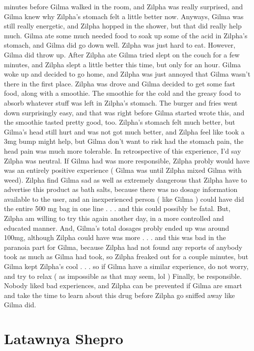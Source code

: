 \documentclass[12pt]{book}
\begin{document}
minutes before Gilma walked in the room, and Zilpha was really surprised, and Gilma knew why Zilpha's stomach felt a little better now. Anyways, Gilma was still really energetic, and Zilpha hopped in the shower, but that did really help much. Gilma ate some much needed food to soak up some of the acid in Zilpha's stomach, and Gilma did go down well. Zilpha was just hard to eat. However, Gilma did throw up. After Zilpha ate Gilma tried slept on the couch for a few minutes, and Zilpha slept a little better this time, but only for an hour. Gilma woke up and decided to go home, and Zilpha was just annoyed that Gilma wasn't there in the first place. Zilpha was drove and Gilma decided to get some fast food, along with a smoothie. The smoothie for the cold and the greasy food to absorb whatever stuff was left in Zilpha's stomach. The burger and fries went down surprisingly easy, and that was right before Gilma started wrote this, and the smoothie tasted pretty good, too. Zilpha's stomach felt much better, but Gilma's head still hurt and was not got much better, and Zilpha feel like took a 3mg bump might help, but Gilma don't want to risk had the stomach pain, the head pain was much more tolerable. In retrospective of this experience, I'd say Zilpha was neutral. If Gilma had was more responsible, Zilpha probly would have was an entirely positive experience ( Gilma was until Zilpha mixed Gilma with weed). Zilpha find Gilma sad as well as extremely dangerous that Zilpha have to advertise this product as bath salts, because there was no dosage information available to the user, and an inexperienced person ( like Gilma ) could have did the entire 500 mg bag in one line . . .  and this could possibly be fatal. But, Zilpha am willing to try this again another day, in a more controlled and educated manner. And, Gilma's total dosages probly ended up was around 100mg, although Zilpha could have was more . . .  and this was bad in the paranoia part for Gilma, because Zilpha had not found any reports of anybody took as much as Gilma had took, so Zilpha freaked out for a couple minutes, but Gilma kept Zilpha's cool . . .  so if Gilma have a similar experience, do not worry, and try to relax ( as impossible as that may seem, lol ) Finally, be responsible. Nobody liked bad experiences, and Zilpha can be prevented if Gilma are smart and take the time to learn about this drug before Zilpha go sniffed away like Gilma did.



\chapter{Latawnya Shepro}
\end{document}
